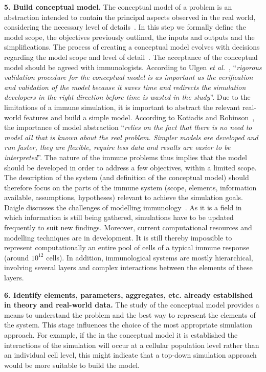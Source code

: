 \documentclass{llncs}
\begin{document}
{\bf 5. Build conceptual model.} The conceptual model of a problem is an abstraction intended to contain the principal aspects observed in the real world, considering the necessary level of details~\cite{Robinson:2008}. In this step we formally define the model scope, the objectives previously outlined, the inputs and outputs and the simplifications. The process of creating a conceptual model evolves with decisions regarding the model scope and level of detail~\cite{Robinson:2004}. The acceptance of the conceptual model should be agreed with immunologists. According to Ulgen {\it et al.}~\cite{Ulgen:1994}, ``{\it rigorous validation procedure for the conceptual model is as important as the verification and validation of the model because it saves time and redirects the simulation developers in the right direction before time is wasted in the study}''. Due to the limitations of a immune simulation, it is important to abstract the relevant real-world features and build a simple model. According to Kotiadis and Robinson~\cite{Robinson:2008}, the importance of model abstraction ``{\it relies on the fact that there is no need to model all that is known about the real problem. Simpler models are developed and run faster, they are flexible, require less data and results are easier to be interpreted}''. The nature of the immune problems thus implies that the model should be developed in order to address a few objectives, within a limited scope. The description of the system (and definition of the conceptual model) should therefore focus on the parts of the immune system (scope, elements, information available, assumptions, hypotheses) relevant to achieve the simulation goals. Daigle discusses the challenges of modelling immunology~\cite{Daigle:2006}. As it is  a field in which information is still being gathered, simulations have to be updated frequently to suit new findings. Moreover, current computational resources and modelling techniques are in development.  It is still thereby impossible to  represent computationally an entire pool of cells of a typical immune response (around $10^{12}$ cells). In addition, immunological systems are mostly hierarchical, involving several layers and complex interactions between the elements of these layers.

{\bf 6. Identify elements, parameters, aggregates, etc. already established in theory and real-world data.} The study of the conceptual model provides a means to understand the problem and the best way to represent the elements of the system. This stage influences the choice of the most appropriate simulation approach. For example, if the in the conceptual model it is established the interactions of the simulation will occur at a cellular population level rather than an individual cell level, this might indicate that a top-down simulation approach would be more suitable to build the model.
\end{document}
